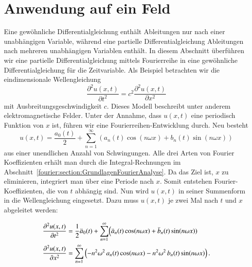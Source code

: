 %
%
%
%



\section{Anwendung auf ein Feld\label{fourier:section:AnwendungAufFeld}}

Eine gewöhnliche Differentialgleichung enthält Ableitungen nur nach einer unabhängigen Variable, während eine partielle Differentialgleichung Ableitungen nach mehreren unabhängigen Variablen enthält.  
In diesem Abschnitt überführen wir eine partielle Differentialgleichung mittels Fourierreihe in eine gewöhnliche Differentialgleichung für die Zeitvariable.
Als Beispiel betrachten wir die eindimensionale Wellengleichung  
\begin{equation}\label{eq:wellengleichung}
	\frac{\partial^2 u(x,t)}{\partial t^2} = c^2 \frac{\partial^2 u(x,t)}{\partial x^2}
\end{equation}  
mit Ausbreitungsgeschwindigkeit $c$. Dieses Modell beschreibt unter anderem elektromagnetische Felder.  
Unter der Annahme, dass $u(x, t)$ eine periodisch Funktion von $x$ ist, führen wir eine Fourierreihen-Entwicklung durch. 
Neu besteht 
\begin{equation}
	u(x,t) = \frac{a_0(t)}{2} + \sum_{n=1}^{\infty} \left( a_n(t) \cos(n \omega x) + b_n(t) \sin(n \omega x) \right)
\end{equation}
aus einer unendlichen Anzahl von Schwingungen.
Alle drei Arten von Fourier Koeffizienten erhält man durch die Integral-Rechnungen im Abschnitt~\ref{fourier:section:GrundlagenFourierAnalyse}. 
Da das Ziel ist, $x$ zu eliminieren, integriert man über eine Periode nach $x$.
Somit entstehen Fourier-Koeffizienten, die von $t$ abhängig sind. 
Nun wird $u(x,t)$ in seiner Summenform in die Wellengleichung eingesetzt. 
Dazu muss $u(x,t)$ je zwei Mal nach $t$ und $x$ abgeleitet werden:

\begin{equation}
	\begin{aligned}
		\frac{\partial^2 u(x,t)}{\partial t^2}
		&= \frac{1}{2}\ddot{a}_0(t) + \sum_{n=1}^{\infty}\Bigl(\ddot{a}_n(t)\cos(n\omega x)+ \ddot{b}_n(t)\sin(n\omega x))
		\\
		\frac{\partial^2 u(x,t)}{\partial x^2}
		&= \sum_{n=1}^{\infty}\left(-n^2\omega^2\,a_n(t)\cos(n\omega x)-n^2\omega^2\,b_n(t)\sin(n\omega x)\right).
	\end{aligned}
\end{equation}


